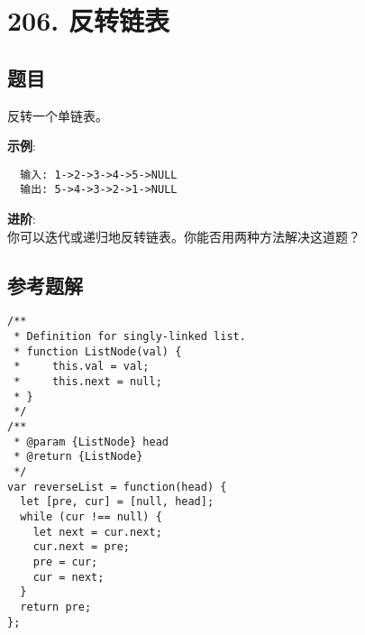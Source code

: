 \newpage
\section{206. 反转链表}
\label{leetcode:206}

\subsection{题目}

反转一个单链表。

\textbf{示例}:

\begin{verbatim}
  输入: 1->2->3->4->5->NULL
  输出: 5->4->3->2->1->NULL
\end{verbatim}

\textbf{进阶}: \\
你可以迭代或递归地反转链表。你能否用两种方法解决这道题？

\subsection{参考题解}

\begin{verbatim}
/**
 * Definition for singly-linked list.
 * function ListNode(val) {
 *     this.val = val;
 *     this.next = null;
 * }
 */
/**
 * @param {ListNode} head
 * @return {ListNode}
 */
var reverseList = function(head) {
  let [pre, cur] = [null, head];
  while (cur !== null) {
    let next = cur.next;
    cur.next = pre;
    pre = cur;
    cur = next;
  }
  return pre;
};
\end{verbatim}
